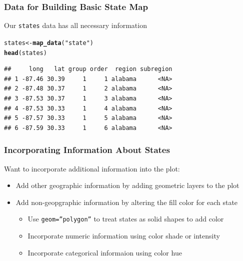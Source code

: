 \documentclass{beamer}\usepackage[]{graphicx}\usepackage[]{color}
\makeatletter
\newcommand{\hlstr}[1]{\textcolor[rgb]{0.192,0.494,0.8}{#1}}%
\newcommand{\hlstd}[1]{\textcolor[rgb]{0.345,0.345,0.345}{#1}}%
\newcommand{\hlkwb}[1]{\textcolor[rgb]{0.69,0.353,0.396}{#1}}%
\newcommand{\hlkwd}[1]{\textcolor[rgb]{0.737,0.353,0.396}{\textbf{#1}}}%
\newenvironment{kframe}{%
 \def\at@end@of@kframe{}%
 \ifinner\ifhmode%
  \def\at@end@of@kframe{\end{minipage}}%
  \begin{minipage}{\columnwidth}%
 \fi\fi%
 \def\FrameCommand##1{\hskip\@totalleftmargin \hskip-\fboxsep
 \colorbox{shadecolor}{##1}\hskip-\fboxsep
     \hskip-\linewidth \hskip-\@totalleftmargin \hskip\columnwidth}%
 \MakeFramed {\advance\hsize-\width
   \@totalleftmargin\z@ \linewidth\hsize
   \@setminipage}}%
 {\par\unskip\endMakeFramed%
 \at@end@of@kframe}
\newenvironment{knitrout}{}{} %
\makeatother
\begin{document}

\begin{frame}[fragile]
    \frametitle{Data for Building Basic State Map}
    
 Our \texttt{states} data has all necessary information
    
    \small
\begin{knitrout}\footnotesize
{}\color{fgcolor}\begin{kframe}
\begin{alltt}
\hlstd{states} \hlkwb{<-} \hlkwd{map_data}\hlstd{(}\hlstr{"state"}\hlstd{)}
\hlkwd{head}\hlstd{(states)}
\end{alltt}
\begin{verbatim}
##     long   lat group order  region subregion
## 1 -87.46 30.39     1     1 alabama      <NA>
## 2 -87.48 30.37     1     2 alabama      <NA>
## 3 -87.53 30.37     1     3 alabama      <NA>
## 4 -87.53 30.33     1     4 alabama      <NA>
## 5 -87.57 30.33     1     5 alabama      <NA>
## 6 -87.59 30.33     1     6 alabama      <NA>
\end{verbatim}
\end{kframe}
\end{knitrout}

    \normalsize
\end{frame}



\begin{frame}
    \frametitle{Incorporating Information About States}
  Want to incorporate additional information into the plot:
    \begin{itemize}
        \item Add other geographic information by adding geometric layers to the plot
        \item Add non-geopgraphic information by altering the fill color for each state
      \begin{itemize}
        \item Use \texttt{geom=''polygon''} to treat states as solid shapes to add color
        \item Incorporate numeric information using color shade or intensity
        \item Incorporate categorical informaion using color hue
      \end{itemize}
    \end{itemize}    
\end{frame}
\end{document}
